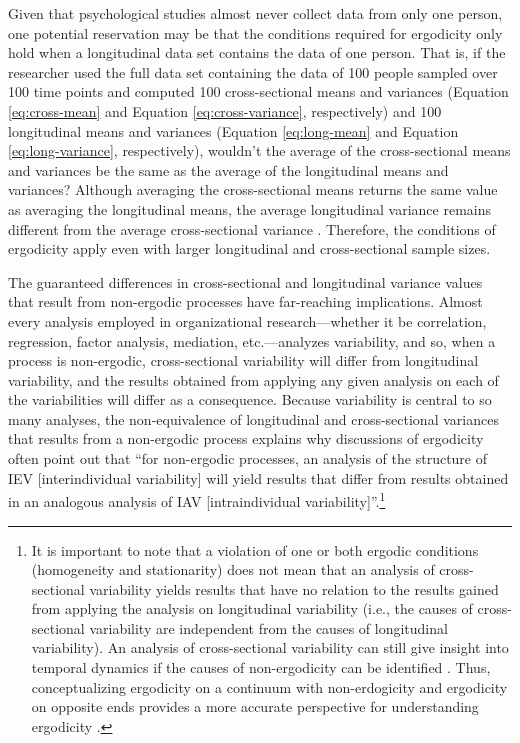 \documentclass[
12pt, %
twoside,
english]{guelphthesis}
\begin{document}
Given that psychological studies almost never collect data from only one person, one potential reservation may be that the conditions required for ergodicity only hold when a longitudinal data set contains the data of one person. That is, if the researcher used the full data set containing the data of 100 people sampled over 100 time points and computed 100 cross-sectional means and variances (Equation \ref{eq:cross-mean} and Equation \ref{eq:cross-variance}, respectively) and 100 longitudinal means and variances (Equation \ref{eq:long-mean} and Equation \ref{eq:long-variance}, respectively), wouldn't the average of the cross-sectional means and variances be the same as the average of the longitudinal means and variances? Although averaging the cross-sectional means returns the same value as averaging the longitudinal means, the average longitudinal variance remains different from the average cross-sectional variance \autocite[for several empirical examples, see][]{fisher2018}. Therefore, the conditions of ergodicity apply even with larger longitudinal and cross-sectional sample sizes.

The guaranteed differences in cross-sectional and longitudinal variance values that result from non-ergodic processes have far-reaching implications. Almost every analysis employed in organizational research---whether it be correlation, regression, factor analysis, mediation, etc.---analyzes variability, and so, when a process is non-ergodic, cross-sectional variability will differ from longitudinal variability, and the results obtained from applying any given analysis on each of the variabilities will differ as a consequence. Because variability is central to so many analyses, the non-equivalence of longitudinal and cross-sectional variances that results from a non-ergodic process explains why discussions of ergodicity often point out that ``for non-ergodic processes, an analysis of the structure of IEV {[}interindividual variability{]} will yield results that differ from results obtained in an analogous analysis of IAV {[}intraindividual variability{]}''\autocite[p.~202]{molenaar2004}.\footnote{It is important to note that a violation of one or both ergodic conditions (homogeneity and stationarity) does not mean that an analysis of cross-sectional variability yields results that have no relation to the results gained from applying the analysis on longitudinal variability (i.e., the causes of cross-sectional variability are independent from the causes of longitudinal variability). An analysis of cross-sectional variability can still give insight into temporal dynamics if the causes of non-ergodicity can be identified \parencites{voelkle2014}[for similar discussion, see][]{spector2019}. Thus, conceptualizing ergodicity on a continuum with non-erdogicity and ergodicity on opposite ends provides a more accurate perspective for understanding ergodicity \parencites{adolf2019}{medaglia2019}.}
\end{document}
